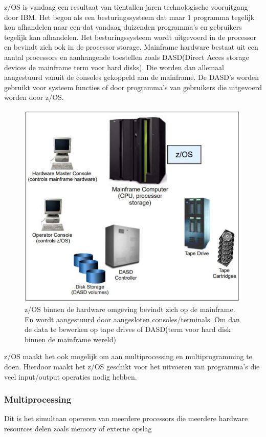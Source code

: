 z/OS is vandaag een resultaat van tientallen jaren technologische vooruitgang door IBM. Het begon als een besturingssysteem dat maar 1 programma tegelijk kon afhandelen naar een dat vandaag duizenden programma's en gebruikers tegelijk kan afhandelen. Het besturingssysteem wordt uitgevoerd in de processor en bevindt zich ook in de processor storage. Mainframe hardware bestaat uit een aantal processors en aanhangende toestellen zoals DASD(Direct Acces storage devices de mainframe term voor hard disks). Die worden dan allemaal aangestuurd vanuit de consoles gekoppeld aan de mainframe. De DASD's worden gebruikt voor systeem functies of door programma's van gebruikers die uitgevoerd worden door z/OS. \cite{Ebbers2011}

\begin{figure}[h]
	\centering
	\includegraphics{img/Omgeving_zOS}
	\caption[z/OS binnen de mainframe omgeving]{z/OS binnen de hardware omgeving bevindt zich op de mainframe. En wordt aangestuurd door aangesloten consoles/terminals. Om dan de data te bewerken op tape drives of DASD(term voor hard disk binnen de mainframe wereld)}
	\label{fig:omgevingzos}
\end{figure}

z/OS maakt het ook mogelijk om aan multiprocessing en multiprogramming te doen. Hierdoor maakt het z/OS geschikt voor het uitvoeren van programma's die veel input/output operaties nodig hebben. 

\subsubsection{Multiprocessing}
\label{subsubsec:Multiprocessing}
Dit is het simultaan opereren van meerdere processors die meerdere hardware resources delen zoals memory of externe opslag

